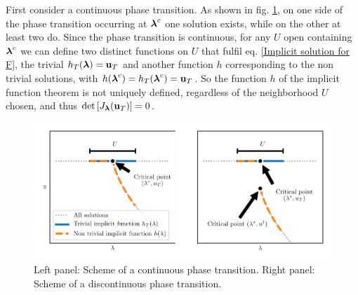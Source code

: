 \documentclass[
11pt, %
english, %
singlespacing, %
nolistspacing, %
liststotoc, %
headsepline, %
]{MastersDoctoralThesis} %
\begin{document}
First consider a continuous phase transition. As shown in fig. \ref{Figure: Scheme of continuous and discontinuous phase transitions}, on one side of the phase transition occurring at $\boldsymbol{\mathrm{\lambda}}^c$ one solution exists, while on the other at least two do. Since the phase transition is continuous, for any $U$ open containing $\boldsymbol{\mathrm{\lambda}}^c$ we can define two distinct functions on $U$ that fulfil eq. \eqref{Implicit solution for F}, the trivial $h_T(\boldsymbol{\mathrm{\lambda}}) = \boldsymbol{\mathrm{u}}_T$ and another function $h$ corresponding to the non trivial solutions, with $h(\boldsymbol{\mathrm{\lambda}}^c) = h_T(\boldsymbol{\mathrm{\lambda}}^c) = \boldsymbol{\mathrm{u}}_T$. So the function $h$ of the implicit function theorem is not uniquely defined, regardless of the neighborhood $U$ chosen, and thus $\det\left[ J_{\boldsymbol{\mathrm{\lambda}}}(\boldsymbol{\mathrm{u}}_T) \right] = 0$.

\begin{figure}
	\includegraphics[width=\textwidth]{critical_point.pdf}
	\caption{Left panel: Scheme of a continuous phase transition. Right panel: Scheme of a discontinuous phase transition.}
	\label{Figure: Scheme of continuous and discontinuous phase transitions}
\end{figure}
\end{document}
